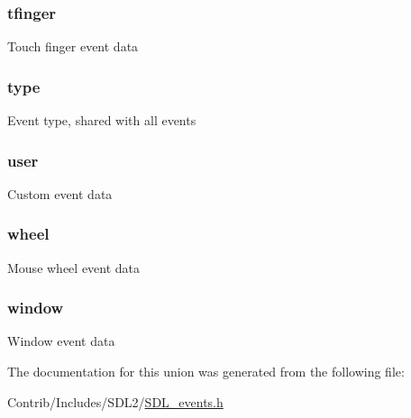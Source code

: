 \subsubsection[{\texorpdfstring{tfinger}{tfinger}}]{ tfinger}\hypertarget{union_s_d_l___event_a7c9be16d80e9c03a6ef9154be5de440e}{}\label{union_s_d_l___event_a7c9be16d80e9c03a6ef9154be5de440e}
Touch finger event data 
\subsubsection[{\texorpdfstring{type}{type}}]{ type}\hypertarget{union_s_d_l___event_aa40a9b05c3154032b9f2d7220e9f08dc}{}\label{union_s_d_l___event_aa40a9b05c3154032b9f2d7220e9f08dc}
Event type, shared with all events 
\subsubsection[{\texorpdfstring{user}{user}}]{ user}\hypertarget{union_s_d_l___event_a32ed3513e4b2533a94bb7bc123294720}{}\label{union_s_d_l___event_a32ed3513e4b2533a94bb7bc123294720}
Custom event data 
\subsubsection[{\texorpdfstring{wheel}{wheel}}]{ wheel}\hypertarget{union_s_d_l___event_a64774818699f12da4c6160fd5ec72200}{}\label{union_s_d_l___event_a64774818699f12da4c6160fd5ec72200}
Mouse wheel event data 
\subsubsection[{\texorpdfstring{window}{window}}]{ window}\hypertarget{union_s_d_l___event_a83e92ef7347f0ea66977d7edd8129058}{}\label{union_s_d_l___event_a83e92ef7347f0ea66977d7edd8129058}
Window event data 

The documentation for this union was generated from the following file\+:\begin{DoxyCompactItemize}
\item 
Contrib/\+Includes/\+S\+D\+L2/\hyperlink{_s_d_l__events_8h}{S\+D\+L\+\_\+events.\+h}\end{DoxyCompactItemize}
